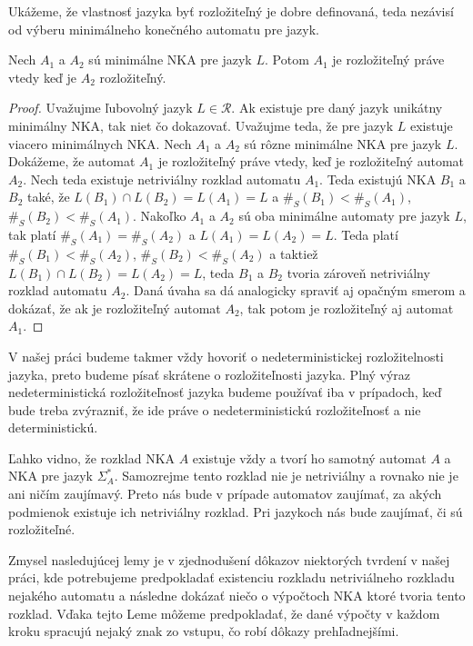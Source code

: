 Ukážeme, že vlastnosť jazyka byť rozložiteľný je dobre definovaná, teda nezávisí od výberu minimálneho konečného automatu pre jazyk.

\begin{proposition}
Nech $ A_1 $ a $ A_2 $ sú minimálne NKA pre jazyk $ L $. Potom $ A_1 $ je rozložiteľný práve vtedy keď je $ A_2 $ rozložiteľný.
\end{proposition}

\begin{proof}
Uvažujme ľubovolný jazyk $ L \in \mathscr{R} $. Ak existuje pre daný jazyk unikátny minimálny NKA, tak niet čo dokazovať. Uvažujme teda, že pre jazyk $ L $ existuje viacero minimálnych NKA. Nech $ A_1 $ a $ A_2 $ sú rôzne minimálne NKA pre jazyk $ L $. Dokážeme, že automat $ A_1 $ je rozložiteľný práve vtedy, keď je rozložiteľný automat $ A_2 $. Nech teda existuje netriviálny rozklad automatu $ A_1 $. Teda existujú NKA $ B_1 $ a $ B_2 $ také, že $ L(B_1) \cap L(B_2) = L(A_1) = L $ a $ \#_S(B_1) < \#_S(A_1) $, $ \#_S(B_2) < \#_S(A_1) $. Nakoľko $ A_1 $ a $ A_2 $ sú oba minimálne automaty pre jazyk $ L $, tak platí $ \#_S(A_1) = \#_S(A_2) $ a $ L(A_1) = L(A_2) = L $. Teda platí $ \#_S(B_1) < \#_S(A_2) $, $ \#_S(B_2) < \#_S(A_2) $ a taktiež $ L(B_1) \cap L(B_2) = L(A_2) = L $, teda $ B_1 $ a $ B_2 $ tvoria zároveň netriviálny rozklad automatu $ A_2 $. Daná úvaha sa dá analogicky spraviť aj opačným smerom a dokázať, že ak je rozložiteľný automat $ A_2 $, tak potom je rozložiteľný aj automat $ A_1 $.
\end{proof}

\begin{note}
V našej práci budeme takmer vždy hovoriť o nedeterministickej rozložitelnosti jazyka, preto budeme písať skrátene o rozložiteľnosti jazyka. Plný výraz nedeterministická rozložiteľnosť jazyka budeme používať iba v prípadoch, keď bude treba zvýrazniť, že ide práve o nedeterministickú rozložiteľnosť a nie deterministickú.
\end{note}

Ľahko vidno, že rozklad NKA $ A $ existuje vždy a tvorí ho samotný automat $ A $ a NKA pre jazyk $ \Sigma_A^{*} $. Samozrejme tento rozklad nie je netriviálny a rovnako nie je ani ničím zaujímavý. Preto nás bude v prípade automatov zaujímať, za akých podmienok existuje ich netriviálny rozklad. Pri jazykoch nás bude zaujímať, či sú rozložiteľné.
\par
Zmysel nasledujúcej lemy je v zjednodušení dôkazov niektorých tvrdení v našej práci, kde potrebujeme predpokladať existenciu rozkladu netriviálneho rozkladu nejakého automatu a následne dokázať niečo o výpočtoch NKA ktoré tvoria tento rozklad. Vďaka tejto Leme môžeme predpokladať, že dané výpočty v každom kroku spracujú nejaký znak zo vstupu, čo robí dôkazy prehľadnejšími.

